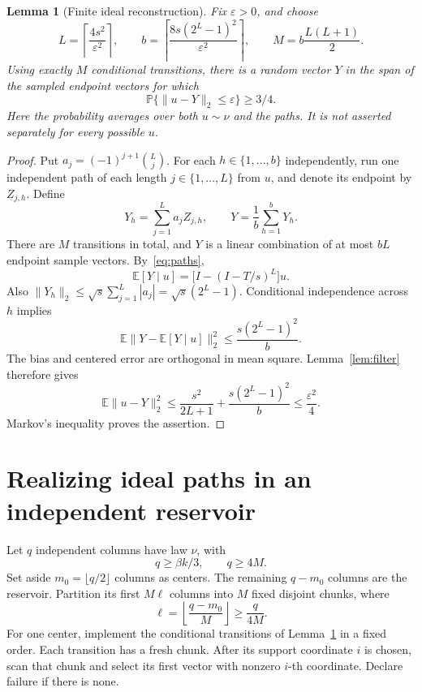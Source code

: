 \documentclass[11pt]{article}
\newtheorem{lemma}[theorem]{Lemma}
\theoremstyle{remark}\newtheorem{remark}[theorem]{Remark}
\newcommand{\E}{\mathbb E}\newcommand{\PP}{\mathbb P}
\begin{document}
\begin{lemma}[Finite ideal reconstruction]\label{lem:ideal}
Fix $\varepsilon>0$, and choose
\begin{equation}\label{eq:LM}
 L=\left\lceil\frac{4s^2}{\varepsilon^2}\right\rceil,\qquad
 b=\left\lceil\frac{8s(2^L-1)^2}{\varepsilon^2}\right\rceil,
 \qquad M=b\frac{L(L+1)}2.
\end{equation}
Using exactly $M$ conditional transitions, there is a random vector $Y$ in the span of the sampled endpoint vectors for which
\[
 \PP\{\|u-Y\|_2\le\varepsilon\}\ge3/4.
\]
Here the probability averages over both $u\sim\nu$ and the paths. It is not asserted separately for every possible $u$.
\end{lemma}
\begin{proof}
Put $a_j=(-1)^{j+1}\binom Lj$. For each $h\in\{1,\dots,b\}$ independently, run one independent path of each length $j\in\{1,\dots,L\}$ from $u$, and denote its endpoint by $Z_{j,h}$. Define
\[
 Y_h=\sum_{j=1}^L a_jZ_{j,h},\qquad Y=\frac1b\sum_{h=1}^bY_h.
\]
There are $M$ transitions in total, and $Y$ is a linear combination of at most $bL$ endpoint sample vectors. By~\eqref{eq:paths},
\[
 \E[Y\mid u]=\big[I-(I-T/s)^L\big]u.
\]
Also $\|Y_h\|_2\le\sqrt s\sum_{j=1}^L|a_j|=\sqrt s(2^L-1)$. Conditional independence across $h$ implies
\[
 \E\|Y-\E[Y\mid u]\|_2^2\le \frac{s(2^L-1)^2}{b}.
\]
The bias and centered error are orthogonal in mean square. Lemma~\ref{lem:filter} therefore gives
\[
 \E\|u-Y\|_2^2
 \le\frac{s^2}{2L+1}+\frac{s(2^L-1)^2}{b}
 \le\frac{\varepsilon^2}{4}.
\]
Markov's inequality proves the assertion.
\end{proof}

\section{Realizing ideal paths in an independent reservoir}
Let $q$ independent columns have law $\nu$, with
\begin{equation}\label{eq:qregime}
 q\ge\beta k/3,\qquad q\ge4M.
\end{equation}
Set aside $m_0=\lfloor q/2\rfloor$ columns as centers. The remaining $q-m_0$ columns are the reservoir. Partition its first $M\ell$ columns into $M$ fixed disjoint chunks, where
\[
 \ell=\left\lfloor\frac{q-m_0}{M}\right\rfloor\ge\frac q{4M}.
\]
For one center, implement the conditional transitions of Lemma~\ref{lem:ideal} in a fixed order. Each transition has a fresh chunk. After its support coordinate $i$ is chosen, scan that chunk and select its first vector with nonzero $i$-th coordinate. Declare failure if there is none.
\end{document}
